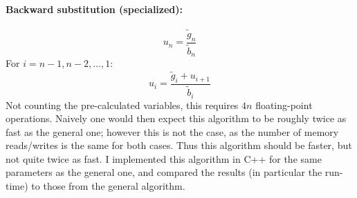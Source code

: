 \documentclass[a4paper,english]{article}
\begin{document}
\paragraph{Backward substitution (specialized):}
\begin{equation}
  u_n = \frac{\tilde{g}_n}{\tilde{b}_n}
\end{equation}
For $i = n-1, n-2, \dots, 1$:
\begin{equation}
  u_i = \frac{\tilde{g}_i+u_{i+1}}{\tilde{b}_i}
\end{equation}
Not counting the pre-calculated variables, this requires $4n$ floating-point operations. Naively one would then expect this algorithm to be roughly twice as fast as the general one; however this is not the case, as the number of memory reads/writes is the same for both cases. Thus this algorithm should be faster, but not quite twice as fast. I implemented this algorithm in C++ for the same parameters as the general one, and compared the results (in particular the run-time) to those from the general algorithm.
\end{document}
